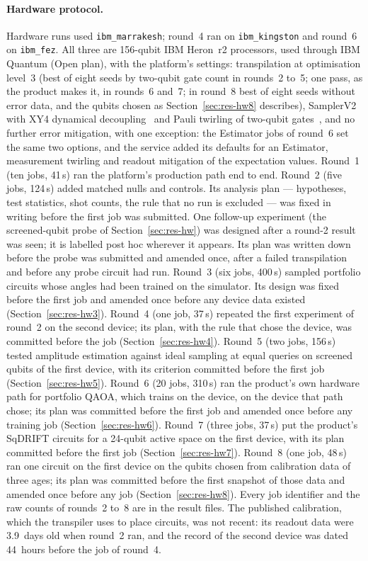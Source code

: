 \documentclass[11pt,a4paper]{article}
\begin{document}
\paragraph{Hardware protocol.} Hardware runs used \texttt{ibm\_marrakesh};
round~4 ran on \texttt{ibm\_kingston} and round~6 on \texttt{ibm\_fez}. All
three are 156-qubit IBM Heron~r2 processors, used
through IBM Quantum (Open plan), with the
platform's settings: transpilation at optimisation level~3 (best of eight
seeds by two-qubit gate count in rounds~2 to~5; one pass, as the product
makes it, in rounds~6 and~7; in round~8 best of eight seeds without error
data, and the qubits chosen as Section~\ref{sec:res-hw8} describes), SamplerV2 with XY4 dynamical
decoupling~\cite{viola1999} and Pauli twirling of two-qubit
gates~\cite{wallman2016}, and no further error mitigation, with one
exception: the Estimator jobs of round~6 set the same two options, and the
service added its defaults for an Estimator, measurement twirling and
readout mitigation of the expectation values. Round~1 (ten
jobs, 41\,s) ran the platform's production path end to end. Round~2 (five
jobs, 124\,s) added matched nulls and controls. Its analysis plan ---
hypotheses, test statistics, shot counts, the rule that no run is excluded
--- was fixed in writing before the first job was submitted. One follow-up
experiment (the screened-qubit probe of Section~\ref{sec:res-hw}) was
designed after a round-2 result was seen; it is labelled post hoc wherever
it appears. Its plan was written down before the probe was submitted and
amended once, after a failed transpilation and before any probe circuit had
run. Round~3 (six jobs, 400\,s) sampled portfolio circuits whose angles had
been trained on the simulator. Its design was fixed before the first job
and amended once before any device data existed
(Section~\ref{sec:res-hw3}). Round~4 (one job, 37\,s) repeated the first
experiment of round~2 on the second device; its plan, with the rule that
chose the device, was committed before the job
(Section~\ref{sec:res-hw4}). Round~5 (two jobs, 156\,s) tested amplitude
estimation against ideal sampling at equal queries on screened qubits of
the first device, with its criterion committed before the first job
(Section~\ref{sec:res-hw5}). Round~6 (20 jobs, 310\,s) ran the product's
own hardware path for portfolio QAOA, which trains on the device, on the
device that path chose; its plan was committed before the first job and
amended once before any training job (Section~\ref{sec:res-hw6}). Round~7
(three jobs, 37\,s) put the product's SqDRIFT circuits for a 24-qubit
active space on the first device, with its plan committed before the first
job (Section~\ref{sec:res-hw7}). Round~8 (one job, 48\,s) ran one circuit
on the first device on the qubits chosen from calibration data of three
ages; its plan was committed before the first snapshot of those data and
amended once before any job (Section~\ref{sec:res-hw8}). Every job
identifier and the raw counts of
rounds~2 to~8 are in the result files. The published calibration,
which the transpiler uses to place circuits, was not recent: its readout
data were 3.9~days old when round~2 ran, and the record of the second
device was dated 44~hours before the job of round~4.
\end{document}
